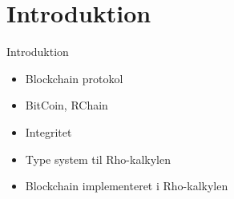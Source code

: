 \section{Introduktion} 


\begin{frame}{Introduktion}
	\begin{itemize}
   \item Blockchain protokol
   \item BitCoin, RChain
   \item Integritet
   \item Type system til Rho-kalkylen
   \item Blockchain implementeret i Rho-kalkylen
   \end{itemize}
\end{frame}


